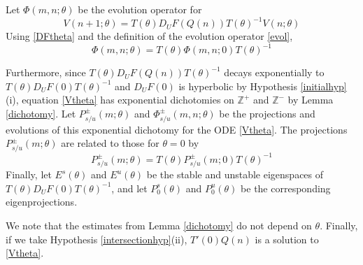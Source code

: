 \documentclass[12pt]{article}
\def\Z{{\mathbb Z}}
\begin{document}
Let $\Phi(m, n; \theta)$ be the evolution operator for
\begin{equation}\label{Vtheta}
V(n+1; \theta) = T(\theta) D_U F(Q(n)) T(\theta)^{-1} V(n; \theta) 
\end{equation}
Using \eqref{DFtheta} and the definition of the evolution operator \eqref{evol},
\[
\Phi(m, n; \theta) = T(\theta)\Phi(m, n; 0)T(\theta)^{-1}
\]

Furthermore, since $T(\theta) D_U F(Q(n)) T(\theta)^{-1}$ decays exponentially to $T(\theta) D_U F(0) T(\theta)^{-1}$ and $D_U F(0)$ is hyperbolic by Hypothesis \ref{initialhyp}(i), equation \eqref{Vtheta} has exponential dichotomies on $\Z^+$ and $\Z^-$ by Lemma \ref{dichotomy}. Let $P_{s/u}^\pm(m; \theta)$ and $\Phi_{s/u}^\pm(m, n; \theta)$ be the projections and evolutions of this exponential dichotomy for the ODE \ref{Vtheta}. The projections $P_{s/u}^\pm(m; \theta)$ are related to those for $\theta = 0$ by
\[
P_{s/u}^\pm(m; \theta) = T(\theta)P_{s/u}^\pm(m; 0)T(\theta)^{-1}
\]
Finally, let $E^s(\theta)$ and $E^u(\theta)$ be the stable and unstable eigenspaces of $T(\theta) D_U F(0) T(\theta)^{-1}$, and let $P_0^s(\theta)$ and $P_0^u(\theta)$ be the corresponding eigenprojections.

We note that the estimates from Lemma \ref{dichotomy} do not depend on $\theta$. Finally, if we take Hypothesis \ref{intersectionhyp}(ii), $T'(0) Q(n)$ is a solution to \eqref{Vtheta}.
\end{document}
